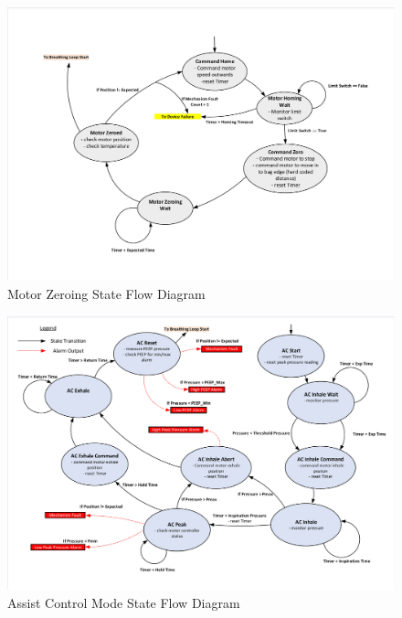 \documentclass[]{article}
\begin{document}
\begin{figure}
	\includegraphics[scale=0.8, trim = 6 6 6 6, clip]{figures/motor_zeroing.pdf}
	\caption{Motor Zeroing State Flow Diagram}
	\label{fig:mz_stfd}
\end{figure}

\begin{figure}
	\includegraphics[scale=0.8, trim = 6 6 6 6, clip]{figures/ac_mode.pdf}
	\caption{Assist Control Mode State Flow Diagram}
	\label{fig:ac_stfd}
\end{figure}
\end{document}
